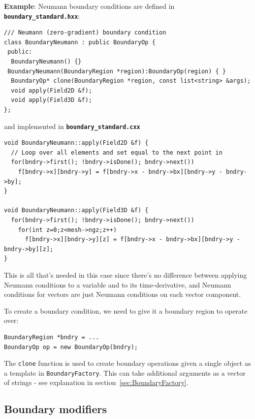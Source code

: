 \documentclass[12pt]{article}
\newcommand{\code}[1]{\texttt{#1}}
\newcommand{\file}[1]{\texttt{\bf #1}}
\begin{document}
{\bf Example}: Neumann boundary conditions are defined in
\file{boundary\_standard.hxx}:
\begin{lstlisting}[firstnumber=22]
/// Neumann (zero-gradient) boundary condition
class BoundaryNeumann : public BoundaryOp {
 public:
  BoundaryNeumann() {}
 BoundaryNeumann(BoundaryRegion *region):BoundaryOp(region) { }
  BoundaryOp* clone(BoundaryRegion *region, const list<string> &args);
  void apply(Field2D &f);
  void apply(Field3D &f);
};
\end{lstlisting}
and implemented in \file{boundary\_standard.cxx} 
\begin{lstlisting}[firstnumber=52]
void BoundaryNeumann::apply(Field2D &f) {
  // Loop over all elements and set equal to the next point in
  for(bndry->first(); !bndry->isDone(); bndry->next())
    f[bndry->x][bndry->y] = f[bndry->x - bndry->bx][bndry->y - bndry->by];
}

void BoundaryNeumann::apply(Field3D &f) {
  for(bndry->first(); !bndry->isDone(); bndry->next())
    for(int z=0;z<mesh->ngz;z++)
      f[bndry->x][bndry->y][z] = f[bndry->x - bndry->bx][bndry->y - bndry->by][z];
}
\end{lstlisting}
This is all that's needed in this case since there's no difference between
applying Neumann conditions to a variable and to its time-derivative, 
and Neumann conditions for vectors are just Neumann conditions
on each vector component. 

To create a boundary condition, we need to give it a boundary region
to operate over:
\begin{lstlisting}[numbers=none]
BoundaryRegion *bndry = ...
BoundaryOp op = new BoundaryOp(bndry);
\end{lstlisting}

The \code{clone} function is used to create
boundary operations given a single object as a template
in \code{BoundaryFactory}. This can take additional arguments
as a vector of strings - see explanation in section~\ref{sec:BoundaryFactory}.

\subsection{Boundary modifiers}
\end{document}
